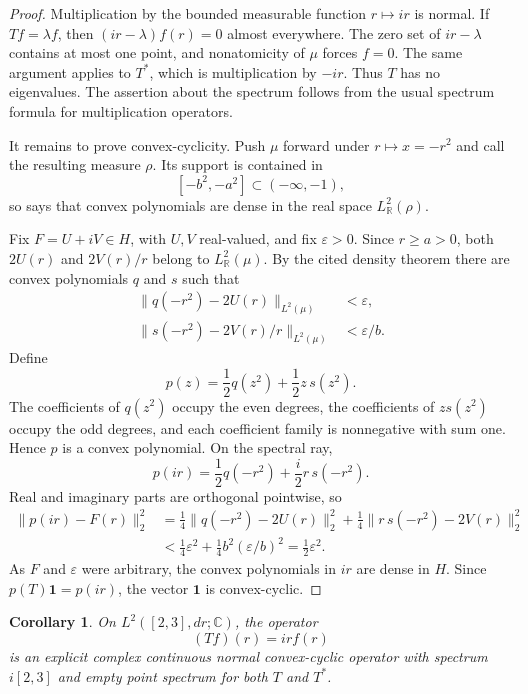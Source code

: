 \documentclass[11pt]{article}
\newtheorem{corollary}[theorem]{Corollary}
\begin{document}
\begin{proof}
Multiplication by the bounded measurable function $r\mapsto ir$ is normal.
If $Tf=\lambda f$, then $(ir-\lambda)f(r)=0$ almost everywhere.  The zero set
of $ir-\lambda$ contains at most one point, and nonatomicity of $\mu$ forces
$f=0$.  The same argument applies to $T^*$, which is multiplication by
$-ir$.  Thus $T$ has no eigenvalues.  The assertion about the spectrum follows
from the usual spectrum formula for multiplication operators.

It remains to prove convex-cyclicity.  Push $\mu$ forward under
$r\mapsto x=-r^2$ and call the resulting measure $\rho$.  Its support is
contained in
\[
   [-b^2,-a^2]\subset(-\infty,-1),
\]
so \cite[Theorem 7.1]{FM} says that convex polynomials are dense in the real
space $L^2_{\mathbb R}(\rho)$.

Fix $F=U+iV\in H$, with $U,V$ real-valued, and fix $\varepsilon>0$.  Since
$r\geq a>0$, both $2U(r)$ and $2V(r)/r$ belong to
$L^2_{\mathbb R}(\mu)$.  By the cited density theorem there are convex
polynomials $q$ and $s$ such that
\begin{align*}
 \|q(-r^2)-2U(r)\|_{L^2(\mu)}&<\varepsilon,\\
 \|s(-r^2)-2V(r)/r\|_{L^2(\mu)}&<\varepsilon/b.
\end{align*}
Define
\[
   p(z)=\frac12q(z^2)+\frac12z\,s(z^2).
\]
The coefficients of $q(z^2)$ occupy the even degrees, the coefficients of
$zs(z^2)$ occupy the odd degrees, and each coefficient family is nonnegative
with sum one.  Hence $p$ is a convex polynomial.  On the spectral ray,
\[
  p(ir)=\frac12q(-r^2)+\frac{i}{2}r\,s(-r^2).
\]
Real and imaginary parts are orthogonal pointwise, so
\begin{align*}
 \|p(ir)-F(r)\|_2^2
 &=\frac14\|q(-r^2)-2U(r)\|_2^2
   +\frac14\|r\,s(-r^2)-2V(r)\|_2^2\\
 &<\frac14\varepsilon^2+\frac14b^2(\varepsilon/b)^2
 =\frac12\varepsilon^2.
\end{align*}
As $F$ and $\varepsilon$ were arbitrary, the convex polynomials in $ir$ are
dense in $H$.  Since $p(T)\mathbf1=p(ir)$, the vector $\mathbf1$ is
convex-cyclic.
\end{proof}

\begin{corollary}
On $L^2([2,3],dr;\mathbb C)$, the operator
\[
    (Tf)(r)=irf(r)
\]
is an explicit complex continuous normal convex-cyclic operator with spectrum
$i[2,3]$ and empty point spectrum for both $T$ and $T^*$.
\end{corollary}
\end{document}
